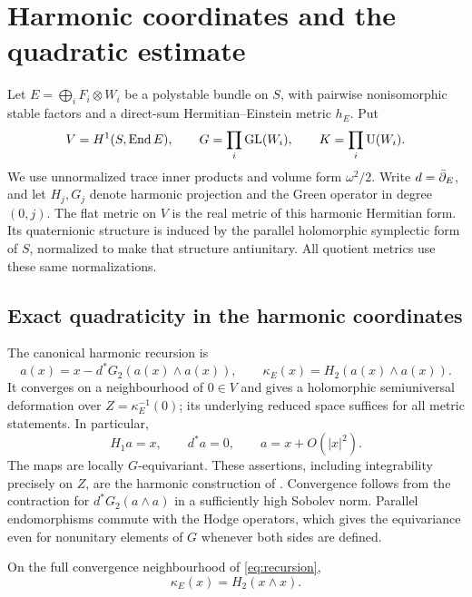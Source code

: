 \section{Harmonic coordinates and the quadratic estimate}\label{sec:harmonic}

Let $E=\bigoplus_i F_i\otimes W_i$ be a polystable bundle on
$S$, with pairwise nonisomorphic stable factors and a direct-sum
Hermitian--Einstein metric $h_E$. Put
\[
 V=H^1(S,\operatorname{End} E),\qquad
 G=\prod_i\operatorname{GL}(W_i),\qquad K=\prod_i\operatorname{U}(W_i).
\]
We use unnormalized trace inner products and volume form
$\omega^2/2$. Write $d=\bar\partial_E$, and let $H_j,G_j$ denote
harmonic projection and the Green operator in degree $(0,j)$.
The flat metric on $V$ is the real metric of this harmonic
Hermitian form. Its quaternionic structure is induced by the
parallel holomorphic symplectic form of $S$, normalized to make
that structure antiunitary. All quotient metrics use these
same normalizations.

\subsection{Exact quadraticity in the harmonic coordinates}
The canonical harmonic recursion is
\begin{equation}\label{eq:recursion}
 a(x)=x-d^*G_2(a(x)\wedge a(x)),\qquad
 \kappa_E(x)=H_2(a(x)\wedge a(x)).
\end{equation}
It converges on a neighbourhood of $0\in V$ and gives a
holomorphic semiuniversal deformation over
$Z=\kappa_E^{-1}(0)$; its underlying reduced space suffices
for all metric statements. In particular,
\begin{equation}\label{eq:coclosed}
 H_1a=x,\qquad d^*a=0,\qquad a=x+O(|x|^2).
\end{equation}
The maps are locally $G$-equivariant. These assertions, including
integrability precisely on $Z$, are the harmonic construction
of \cite[Lemma~2.1]{wuebben15}. Convergence follows from the
contraction for $d^*G_2(a\wedge a)$ in a sufficiently high
Sobolev norm. Parallel endomorphisms commute with the Hodge
operators, which gives the equivariance even for nonunitary
elements of $G$ whenever both sides are defined.

\begin{lemma}\label{lem:quadraticity}
On the full convergence neighbourhood of \eqref{eq:recursion},
\begin{equation}\label{eq:exact-quadraticity}
 \kappa_E(x)=H_2(x\wedge x).
\end{equation}
\end{lemma}

